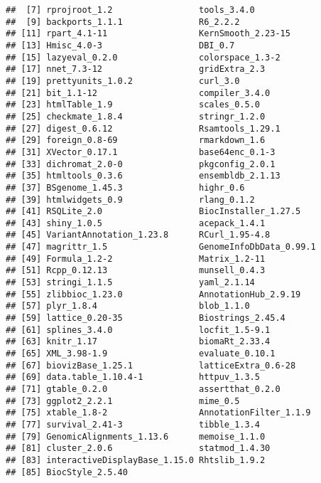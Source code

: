 \documentclass{report}\usepackage[]{graphicx}\usepackage[usenames,dvipsnames]{color}
\newenvironment{knitrout}{}{} %
\begin{document}
\begin{knitrout}
\begin{kframe}
\begin{verbatim}
##  [7] rprojroot_1.2                 tools_3.4.0                  
##  [9] backports_1.1.1               R6_2.2.2                     
## [11] rpart_4.1-11                  KernSmooth_2.23-15           
## [13] Hmisc_4.0-3                   DBI_0.7                      
## [15] lazyeval_0.2.0                colorspace_1.3-2             
## [17] nnet_7.3-12                   gridExtra_2.3                
## [19] prettyunits_1.0.2             curl_3.0                     
## [21] bit_1.1-12                    compiler_3.4.0               
## [23] htmlTable_1.9                 scales_0.5.0                 
## [25] checkmate_1.8.4               stringr_1.2.0                
## [27] digest_0.6.12                 Rsamtools_1.29.1             
## [29] foreign_0.8-69                rmarkdown_1.6                
## [31] XVector_0.17.1                base64enc_0.1-3              
## [33] dichromat_2.0-0               pkgconfig_2.0.1              
## [35] htmltools_0.3.6               ensembldb_2.1.13             
## [37] BSgenome_1.45.3               highr_0.6                    
## [39] htmlwidgets_0.9               rlang_0.1.2                  
## [41] RSQLite_2.0                   BiocInstaller_1.27.5         
## [43] shiny_1.0.5                   acepack_1.4.1                
## [45] VariantAnnotation_1.23.8      RCurl_1.95-4.8               
## [47] magrittr_1.5                  GenomeInfoDbData_0.99.1      
## [49] Formula_1.2-2                 Matrix_1.2-11                
## [51] Rcpp_0.12.13                  munsell_0.4.3                
## [53] stringi_1.1.5                 yaml_2.1.14                  
## [55] zlibbioc_1.23.0               AnnotationHub_2.9.19         
## [57] plyr_1.8.4                    blob_1.1.0                   
## [59] lattice_0.20-35               Biostrings_2.45.4            
## [61] splines_3.4.0                 locfit_1.5-9.1               
## [63] knitr_1.17                    biomaRt_2.33.4               
## [65] XML_3.98-1.9                  evaluate_0.10.1              
## [67] biovizBase_1.25.1             latticeExtra_0.6-28          
## [69] data.table_1.10.4-1           httpuv_1.3.5                 
## [71] gtable_0.2.0                  assertthat_0.2.0             
## [73] ggplot2_2.2.1                 mime_0.5                     
## [75] xtable_1.8-2                  AnnotationFilter_1.1.9       
## [77] survival_2.41-3               tibble_1.3.4                 
## [79] GenomicAlignments_1.13.6      memoise_1.1.0                
## [81] cluster_2.0.6                 statmod_1.4.30               
## [83] interactiveDisplayBase_1.15.0 Rhtslib_1.9.2                
## [85] BiocStyle_2.5.40
\end{verbatim}
\end{kframe}
\end{knitrout}


\end{document}
